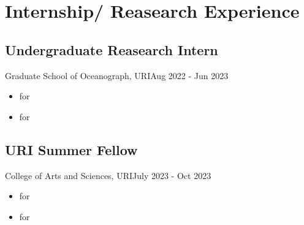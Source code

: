 \section{Internship/ Reasearch Experience}
\subsection{Undergraduate Reasearch Intern}{Graduate School of Oceanograph, URI}{Aug 2022 - Jun 2023}
\begin{itemize}
    \item \lipsum[2][2] \emph{\lipsum[2][1]} for \textbf{\lipsum[5][1]} \lipsum[1][1] \textbf{\lipsum[4][4]} 
    \item \lipsum[2][2] \emph{\lipsum[2][1]} for \textbf{\lipsum[5][1]} \lipsum[1][1] \textbf{\lipsum[4][4]} 
\end{itemize}
\subsection{URI Summer Fellow}{College of Arts and Sciences, URI}{July 2023 - Oct 2023}
\begin{itemize}
    \item \lipsum[2][2] \emph{\lipsum[2][1]} for \textbf{\lipsum[5][1]} \lipsum[1][1] \textbf{\lipsum[4][4]} 
    \item \lipsum[2][2] \emph{\lipsum[2][1]} for \textbf{\lipsum[5][1]} \lipsum[1][1] \textbf{\lipsum[4][4]} 
\end{itemize}


